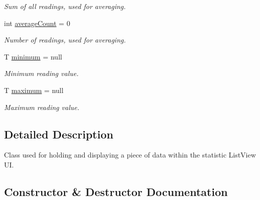 \begin{DoxyCompactItemize}
\begin{DoxyCompactList}\small\item\em Sum of all readings, used for averaging. \end{DoxyCompactList}\item 
\mbox{\label{class_android_app_1_1_data_item_ae8ac0338f533843c475fac5e6510ce5c}} 
int \hyperlink{class_android_app_1_1_data_item_ae8ac0338f533843c475fac5e6510ce5c}{average\+Count} = 0
\begin{DoxyCompactList}\small\item\em Number of readings, used for averaging. \end{DoxyCompactList}\item 
\mbox{\label{class_android_app_1_1_data_item_a23e9e2f0dbcfe5e163cd57888ed3dbd7}} 
T \hyperlink{class_android_app_1_1_data_item_a23e9e2f0dbcfe5e163cd57888ed3dbd7}{minimum} = null
\begin{DoxyCompactList}\small\item\em Minimum reading value. \end{DoxyCompactList}\item 
\mbox{\label{class_android_app_1_1_data_item_a6e53719b27d08f889c4d6460254583dc}} 
T \hyperlink{class_android_app_1_1_data_item_a6e53719b27d08f889c4d6460254583dc}{maximum} = null
\begin{DoxyCompactList}\small\item\em Maximum reading value. \end{DoxyCompactList}\end{DoxyCompactItemize}


\subsection{Detailed Description}
Class used for holding and displaying a piece of data within the statistic List\+View UI. 

\subsection{Constructor \& Destructor Documentation}
\mbox{\label{class_android_app_1_1_data_item_a11dd3418028a213466ac1c075120de57}} 
